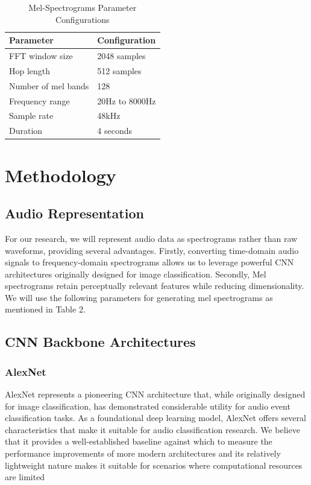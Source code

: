 \documentclass[11pt]{article}
\begin{document}
\begin{table}[ht]
  \centering
  \begin{tabular}{|p{3cm}|p{5cm}|}
    \hline
    \textbf{Parameter}& \textbf{Configuration}\\
    \hline
    FFT window size& 2048 samples\\
    \hline
    Hop length& 512 samples\\
    \hline
    Number of mel bands& 128\\
    \hline
    Frequency range& 20Hz to 8000Hz\\
    \hline
 Sample rate& 48kHz\\\hline
 Duration&4 seconds\\\hline
  \end{tabular}
  \caption{Mel-Spectrograms Parameter Configurations}
\end{table}
\section{Methodology}
\subsection{Audio Representation}
For our research, we will represent audio data as spectrograms rather than raw waveforms, providing several advantages. Firstly, converting time-domain audio signals to frequency-domain spectrograms allows us to leverage powerful CNN architectures originally designed for image classification. Secondly, Mel spectrograms retain perceptually relevant features while reducing dimensionality.
We will use the following parameters for generating mel spectrograms as mentioned in Table 2.

\subsection{CNN Backbone Architectures}
\subsubsection{AlexNet}
AlexNet represents a pioneering CNN architecture that, while originally designed for image classification, has demonstrated considerable utility for audio event classification tasks. As a foundational deep learning model, AlexNet offers several characteristics that make it suitable for audio classification research. We believe that it provides a well-established baseline against which to measure the performance improvements of more modern architectures and its relatively lightweight nature makes it suitable for scenarios where computational resources are limited
\end{document}
